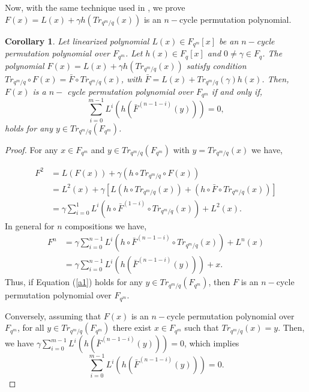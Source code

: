 \documentclass[12pt,a4paper]{article}
\newtheorem{corollary}{Corollary}[section]
\begin{document}
Now, with the same technique used in \cite{niu2023more}, we prove $ F(x)=L(x)+\gamma h(Tr_{q^{m}/q}(x)) $ is an $ n-$cycle permutation polynomial.
\begin{corollary}\label{t3}
	Let linearized polynomial $ L(x)\in F_{q^{m}}[x] $ be an $ n-$cycle permutation polynomial over $ F_{q^{m}} $. Let $ h(x)\in F_{q}[x] $ and  $0\not=\gamma\in F_{q} $. The polynomial $ F(x)=L(x)+\gamma h(Tr_{q^{m}/q}(x)) $ satisfy condition $ Tr_{q^{m}/q}\circ F(x)=\bar{F}\circ Tr_{q^{m}/q}(x) $, with $ \bar{F}=L(x)+Tr_{q^{m}/q}(\gamma)h(x) $. Then, $ F(x) $ is a $ n -$ cycle permutation polynomial over $ F_{q^{m}} $ if and only if, 
	\begin{equation}\label{a1}
		\sum\limits_{i=0}^{m-1}L^{i}(h(\bar{F}^{(n-1-i)}(y)))=0 ,
	\end{equation}
	holds for any $ y \in Tr_{q^{m}/q}(F_{q^{m}}) $.
\end{corollary}
\begin{proof}
	For any $ x\in F_{q^{m}} $ and $ y \in Tr_{q^{m}/q}(F_{q^{m}}) $ with $ y=Tr_{q^{m}/q}(x) $ we have,
	
	\begin{equation}
		\begin{split}
			F^{2} & =L(F(x))+\gamma(h\circ Tr_{q^{m}/q}\circ F(x))\\
			&=L^{2}(x)+\gamma[L(h\circ Tr_{q^{m}/q}(x))+(h\circ\bar{F}\circ Tr_{q^{m}/q}(x))]\\
			&=\gamma \sum\limits_{i=0}^{1}L^{i}(h\circ \bar{F}^{(1-i)}\circ Tr_{q^{m}/q}(x))+L^{2}(x).
		\end{split}
	\end{equation}
	In general for $ n $ compositions we have,
	\begin{equation}\label{a2}
		\begin{split}
			F^{n}&=\gamma\sum\limits_{i=0}^{n-1}L^{i}(h\circ \bar{F}^{(n-1-i)}\circ Tr_{q^{m}/q}(x))+L^{n}(x)\\
			&=\gamma\sum\limits_{i=0}^{n-1}L^{i}(h( \bar{F}^{(n-1-i)}(y)))+x.
		\end{split}
	\end{equation} 
	Thus, if Equation (\ref{a1}) holds for any $ y\in Tr_{q^{m}/q}(F_{q^{m}}) $, then $ F $ is an $ n-$cycle permutation polynomial over $ F_{q^{m}} $. 
	
	Conversely, assuming that $ F(x) $ is an $ n-$cycle permutation polynomial over $ F_{q^{m}} $, for all $ y\in Tr_{q^{m}/q}(F_{q^{m}}) $ there exist $ x\in F_{q^{m}} $ such that $ Tr_{q^{m}/q}(x)=y $. Then, we  have $\gamma\sum\limits_{i=0}^{m-1}L^{i}(h( \bar{F}^{(n-1-i)}(y)))=0$, which implies $$ \sum\limits_{i=0}^{m-1}L^{i}(h(\bar{F}^{(n-1-i)}(y)))=0.$$
\end{proof}
\end{document}
